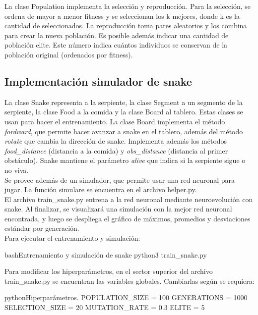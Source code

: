 \documentclass[letterpaper,11pt]{article} %
\begin{document}
La clase Population implementa la selección y reproducción. Para la selección, se ordena de mayor a menor fitness y se seleccionan los k mejores, donde k es la cantidad de seleccionados. La reproducción toma pares aleatorios y los combina para crear la nueva población. Es posible además indicar una cantidad de población elite. Este número indica cuántos individuos se conservan de la población original (ordenados por fitness).


\subsection{Implementación simulador de snake}

La clase Snake representa a la serpiente, la clase Segment a un segmento de la serpiente, la clase Food a la comida y la clase Board al tablero. Estas clases se usan para hacer el entrenamiento. La clase Board implementa el método \textit{fordward}, que permite hacer avanzar a snake en el tablero, además del método \textit{rotate} que cambia la dirección de snake. Implementa además los métodos \textit{food\_distance} (distancia a la comida) y \textit{obs\_distance} (distancia al primer obstáculo). Snake mantiene el parámetro \textit{alive} que indica si la serpiente sigue o no viva. \\

Se provee además de un simulador, que permite usar una red neuronal para jugar. La función simulare se encuentra en el archivo helper.py.\\

El archivo train\_snake.py entrena a la red neuronal mediante neuroevolución con snake. Al finalizar, se visualizará una simulación con la mejor red neuronal encontrada, y luego se despliega el gráfico de máximos, promedios y desviaciones estándar por generación.\\

Para ejecutar el entrenamiento y simulación:

\begin{sourcecode}[\label{train}]{bash}{Entrenamiento y simulación de snake}
python3 train_snake.py 
\end{sourcecode}

Para modificar los hiperparámetros, en el sector superior del archivo train\_snake.py se encuentran las variables globales. Cambiarlas según se requiera:

\begin{sourcecode}[\label{hiperparámetros}]{python}{Hiperparámetros.}
POPULATION_SIZE = 100
GENERATIONS = 1000
SELECTION_SIZE = 20
MUTATION_RATE = 0.3
ELITE = 5
\end{sourcecode}
\end{document}
